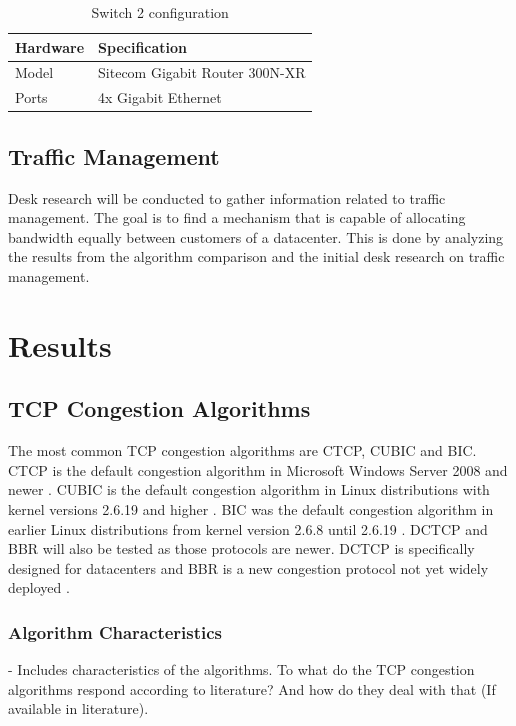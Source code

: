 \documentclass{article}
\begin{document}
		\begin{table}[H]
			\centering
			\caption{Switch 2 configuration}
			\begin{tabular}[H]{ | l | l | }
			\hline
			\textbf{Hardware} & \textbf{Specification} \\
			\hline  Model & Sitecom Gigabit Router 300N-XR\\
			\hline  Ports & 4x Gigabit Ethernet\\
			\hline
			\end{tabular}
			\label{table:spec3}
		\end{table}

	\subsection{Traffic Management}
	Desk research will be conducted to gather information related to traffic management. The goal is to find a mechanism that is capable of allocating bandwidth equally between customers of a datacenter. This is done by analyzing the results from the algorithm comparison and the initial desk research on traffic management. 

\section{Results}
	\subsection{TCP Congestion Algorithms}
	The most common TCP congestion algorithms are CTCP, CUBIC and BIC. CTCP is the default congestion algorithm in Microsoft Windows Server 2008 and newer \cite{cubic-kernel-version}. CUBIC is the default congestion algorithm in Linux distributions with kernel versions 2.6.19 and higher \cite{cubic-kernel-version}. BIC was the default congestion algorithm in earlier Linux distributions from kernel version 2.6.8 until 2.6.19 \cite{bic-kernel-version} \cite{cubic-kernel-version}. DCTCP and BBR will also be tested as those protocols are newer. DCTCP is specifically designed for datacenters \cite{dctcp-congestion} and BBR is a new congestion protocol not yet widely deployed \cite{bbr-congestion}.
	
		\subsubsection{Algorithm Characteristics}
		- Includes characteristics of the algorithms. To what do the TCP congestion algorithms respond according to literature? And how do they deal with that (If available in literature).
		
\end{document}
